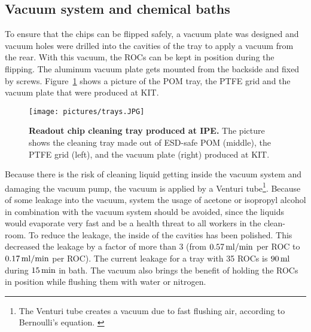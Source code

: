 \subsection{Vacuum system and chemical baths}
To ensure that the chips can be flipped safely, a vacuum plate was designed and vacuum holes were drilled into the cavities of the tray to apply a vacuum from the rear. With this vacuum, the \acs{ROC}s can be kept in position during the flipping.  The aluminum vacuum plate gets mounted from the backside and fixed by screws. Figure~\ref{pic:cleaning_tray_produced} shows a picture of the \acs{POM} tray, the \ac{PTFE} grid and the vacuum plate that were produced at \ac{KIT}.
\begin{figure}
\begin{center}
\texttt{[image: pictures/trays.JPG]}
\end{center}
\caption[Readout chip cleaning tray produced at KIT.]{\textbf{Readout chip cleaning tray produced at \ac{IPE}.} The picture shows the cleaning tray made out of \acs{ESD}-safe \acs{POM} (middle), the \ac{PTFE} grid (left), and the vacuum plate (right) produced at \ac{KIT}.}\label{pic:cleaning_tray_produced}
\end{figure}

Because there is the risk of cleaning liquid getting inside the vacuum system and damaging the vacuum pump, the vacuum is applied by a Venturi tube\footnote{The Venturi tube creates a vacuum due to fast flushing air, according to Bernoulli's equation. \cite{Sch07}}. Because of some leakage into the vacuum, system the usage of acetone or isopropyl alcohol in combination with the vacuum system should be avoided, since the liquids would evaporate very fast and be a health threat to all workers in the clean-room. To reduce the leakage, the inside of the cavities has been polished. This decreased the leakage by a factor of more than 3 (from $0.57\,\rm{ml/min}$ per \acs{ROC} to $0.17\,\rm{ml/min}$ per \acs{ROC}). The current leakage for a tray with 35 \acs{ROC}s is $90\, \rm{ml}$ during $15\,\rm{min}$ in bath. The vacuum also brings the benefit of holding the \acs{ROC}s in position while flushing them with water or nitrogen. %

